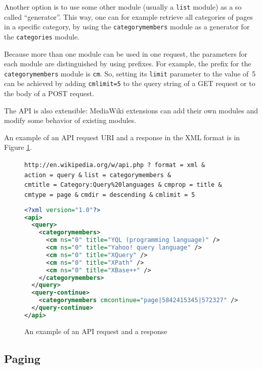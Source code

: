 Another option is to use some other module (usually a \texttt{list} module) as a so called “generator”.
This way, one can for example retrieve all categories of pages in a specific category,
by using the \texttt{categorymembers} module as a generator for the \texttt{categories} module.

Because more than one module can be used in one request,
the parameters for each module are distinguished by using prefixes.
For example, the prefix for the \texttt{categorymembers} module is \texttt{cm}.
So, setting its \texttt{limit} parameter to the value of~5 can be achieved by
adding \texttt{cmlimit=5} to the query string of a GET request or to the body of a POST request.

The API is also extensible: MediaWiki extensions can add their own modules and modify some behavior of existing modules.

An example of an API request URI and a response in the XML format is in Figure \ref{API example}.

\begin{figure}[htbp]
\texttt{http://en.wikipedia.org/w/api.php}~\texttt{?}\
\texttt{format}~\texttt{=}~\texttt{xml}~\texttt{\&}
\texttt{action}~\texttt{=}~\texttt{query}~\texttt{\&}
\texttt{list}~\texttt{=}~\texttt{categorymembers}~\texttt{\&}
\texttt{cmtitle}~\texttt{=}~\texttt{Category:Query\%20languages}~\texttt{\&}
\texttt{cmprop}~\texttt{=}~\texttt{title}~\texttt{\&}
\texttt{cmtype}~\texttt{=}~\texttt{page}~\texttt{\&}
\texttt{cmdir}~\texttt{=}~\texttt{descending}~\texttt{\&}
\texttt{cmlimit}~\texttt{=}~\texttt{5}

\begin{lstlisting}[language=xml]
<?xml version="1.0"?>
<api>
  <query>
    <categorymembers>
      <cm ns="0" title="YQL (programming language)" />
      <cm ns="0" title="Yahoo! query language" />
      <cm ns="0" title="XQuery" />
      <cm ns="0" title="XPath" />
      <cm ns="0" title="XBase++" />
    </categorymembers>
  </query>
  <query-continue>
    <categorymembers cmcontinue="page|5842415345|572327" />
  </query-continue>
</api>
\end{lstlisting}

\caption{An example of an API request and a response}
\label{API example}
\end{figure}

\subsection{Paging}
\label{mw paging}

